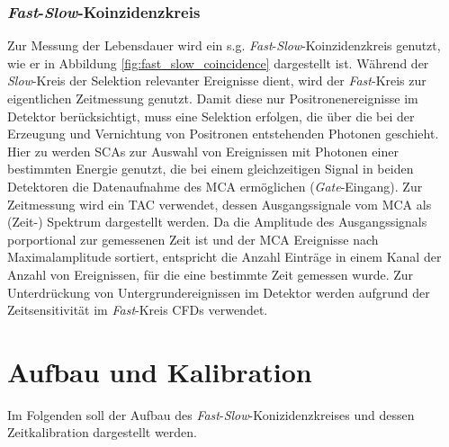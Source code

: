 \documentclass[11pt, a4paper]{article}
\numberwithin{equation}{section}
\begin{document}
\subsubsection{\textit{Fast}-\textit{Slow}-Koinzidenzkreis}

Zur Messung der Lebensdauer wird ein s.g. \textit{Fast}-\textit{Slow}-Koinzidenzkreis genutzt, wie er in Abbildung \ref{fig:fast_slow_coincidence} dargestellt ist.
Während der \textit{Slow}-Kreis der Selektion relevanter Ereignisse dient, wird der \textit{Fast}-Kreis zur eigentlichen Zeitmessung genutzt.
Damit diese nur Positronenereignisse im Detektor berücksichtigt, muss eine Selektion erfolgen, die über die bei der Erzeugung und Vernichtung von Positronen entstehenden Photonen geschieht.
Hier zu werden SCAs zur Auswahl von Ereignissen mit Photonen einer bestimmten Energie genutzt, die bei einem gleichzeitigen Signal in beiden Detektoren die Datenaufnahme des MCA ermöglichen (\textit{Gate}-Eingang).
Zur Zeitmessung wird ein TAC verwendet, dessen Ausgangssignale vom MCA als (Zeit-) Spektrum dargestellt werden.
Da die Amplitude des Ausgangssignals porportional zur gemessenen Zeit ist und der MCA Ereignisse nach Maximalamplitude sortiert, entspricht die Anzahl Einträge in einem Kanal der Anzahl von Ereignissen, für die eine bestimmte Zeit gemessen wurde.
Zur Unterdrückung von Untergrundereignissen im Detektor werden aufgrund der Zeitsensitivität im \textit{Fast}-Kreis CFDs verwendet.

\section{Aufbau und Kalibration}

Im Folgenden soll der Aufbau des \textit{Fast}-\textit{Slow}-Konizidenzkreises und dessen Zeitkalibration dargestellt werden.
\end{document}
